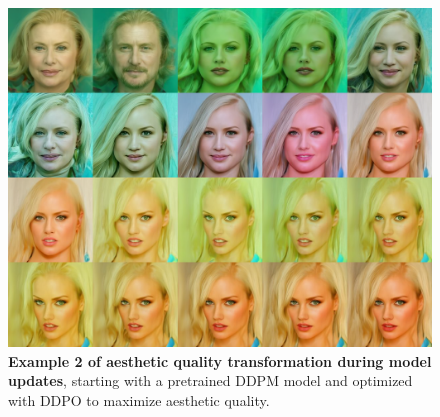 \begin{appendixs}
        \begin{figure}
            \centering
            \includegraphics[scale=1.40]{img/results/laion_12.png}
            \vspace{-0pt}  %
            \captionsetup{width=\textwidth} %
            \caption{\textbf{Example 2 of aesthetic quality transformation during model updates}, starting with a pretrained DDPM model and optimized with DDPO to maximize aesthetic quality.}
            \label{fig:ddpm-to-ddpo-aesthetic-extra2}
        \end{figure}


\end{appendixs}

